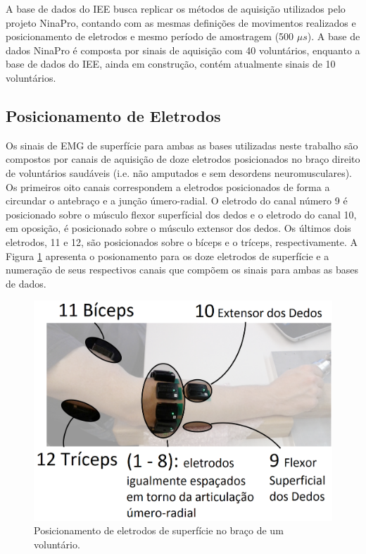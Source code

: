 A base de dados do IEE busca replicar os métodos de aquisição utilizados pelo projeto NinaPro, contando com as mesmas definições de movimentos realizados e posicionamento de eletrodos e mesmo período de amostragem (500 $\mu s$). A base de dados NinaPro é composta por sinais de aquisição com 40 voluntários, enquanto a base de dados do IEE, ainda em construção, contém atualmente sinais de 10 voluntários.

			\subsection{Posicionamento de Eletrodos}
Os sinais de EMG de superfície para ambas as bases utilizadas neste trabalho são compostos por canais de aquisição de doze eletrodos posicionados no braço direito de voluntários saudáveis (i.e. não amputados e sem desordens neuromusculares). Os primeiros oito canais correspondem a eletrodos posicionados de forma a circundar o antebraço e a junção úmero-radial. O eletrodo do canal número 9 é posicionado sobre o músculo flexor superfícial dos dedos e o eletrodo do canal 10, em oposição, é posicionado sobre o músculo extensor dos dedos. Os últimos dois eletrodos, 11 e 12, são posicionados sobre o bíceps e o tríceps, respectivamente. A Figura \ref{fig:eletrodos} apresenta o posionamento para os doze eletrodos de superfície e a numeração de seus respectivos canais que compõem os sinais para ambas as bases de dados.

\begin{figure}[htb]
	\caption{\label{fig:eletrodos}Posicionamento de eletrodos de superfície no braço de um voluntário.}
	\begin{center}
	    \includegraphics[width=0.75\linewidth]{./img/eletrodos.png}
	\end{center}
\end{figure}

